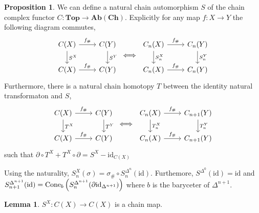 \documentclass[12pt]{extarticle}
\newcommand{\id}{\mathrm{id}}
\newcommand{\Top}{\mathbf{Top}}
\theoremstyle{definition}
\newtheorem{lemma}[theorem]{Lemma}
\newtheorem{proposition}[theorem]{Proposition}
\newenvironment{definition}[1][Definition:]{\begin{trivlist}
\item[\hskip \labelsep {\bfseries #1}]}{\end{trivlist}}
\begin{document}
\begin{proposition}
We can define a natural chain automorphism $S$ of the chain complex functor $C : \Top \to \mathbf{Ab(Ch)}$. Explicitly for any map $f : X \to Y$ the following diagram commutes,
\[
\begin{tikzcd}
C(X) \arrow[r, "f_{\#}"] \arrow[d, "S^X"] & C(Y) \arrow[d, "S^Y"] 
\\
C(X) \arrow[r, "f_{\#}"] & C(Y)
\end{tikzcd}
\iff 
\begin{tikzcd}
C_n(X) \arrow[r, "f_{\#}"] \arrow[d, "S^X_n"] & C_n(Y) \arrow[d, "S^Y_n"] 
\\
C_n(X) \arrow[r, "f_{\#}"] & C_n(Y)
\end{tikzcd}
\]
Furthermore, there is a natural chain homotopy $T$ between the identity natural transformaton and $S$,
\[
\begin{tikzcd}
C(X) \arrow[r, "f_{\#}"] \arrow[d, "T^X"] & C(Y) \arrow[d, "T^Y"] 
\\
C(X) \arrow[r, "f_{\#}"] & C(Y)
\end{tikzcd}
\iff 
\begin{tikzcd}
C_n(X) \arrow[r, "f_{\#}"] \arrow[d, "T^X_n"] & C_{n+1}(Y) \arrow[d, "T^Y_n"] 
\\
C_n(X) \arrow[r, "f_{\#}"] & C_{n+1}(Y)
\end{tikzcd}
\]
such that $\partial \circ T^X + T^X \circ \partial = S^{X} - \id_{C(X)}$
\end{proposition}

\begin{definition}
Using the naturality, $S^X_{n}(\sigma) = \sigma_{\#} \circ S^{\Delta^{n}}_n(\id)$.  Furthemore,
$S^{\Delta^0}(\id) = \id$ and $S^{\Delta^{n+1}}_{n+1}(\id) = \cone_b\left( S^{\Delta^{n+1}}_n(\partial \id_{\Delta^{n+1}}) \right)$
where $b$ is the baryceter of $\Delta^{n+1}$. 
\end{definition}

\begin{lemma}
$S^X : C(X) \to C(X)$ is a chain map.
\end{lemma}
\end{document}
